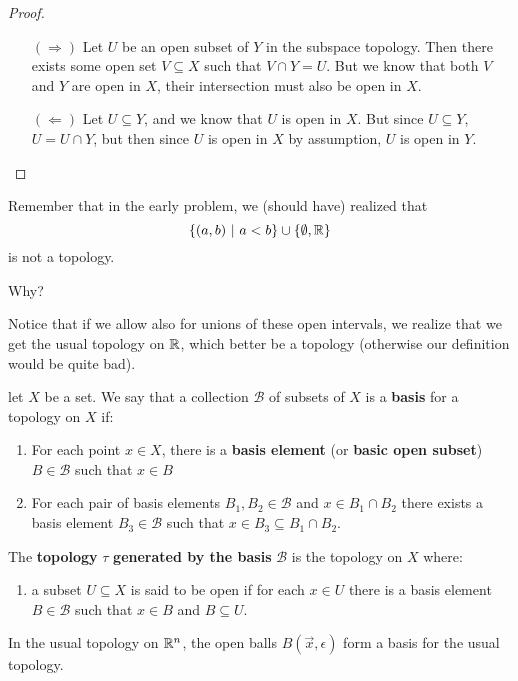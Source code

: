 \documentclass[12pt, twosided]{article}
\begin{document}
\begin{proof}
  \begin{enumerate}
  \item [\((\Rightarrow)\)] Let \(U\) be an open subset of \(Y\) in the subspace topology. Then there exists some open set \(V \subseteq X\) such that \(V \cap Y = U\). But we know that both \(V\) and \(Y\) are open in \(X\), their intersection must also be open in \(X\).
  \item [\((\Leftarrow)\)] Let \(U \subseteq Y\), and we know that \(U\) is open in \(X\). But since \(U \subseteq Y\), \(U = U \cap Y\), but then since \(U\) is open in \(X\) by assumption, \(U\) is open in \(Y\).
  \end{enumerate}
\end{proof}

Remember that in the early problem, we (should have) realized that \[\left\{ (a, b)\ \middle\vert\ a < b\right\} \cup \left\{ \emptyset, \mathbb{R} \right\}\] is not a topology.
\begin{exr}
  Why?
\end{exr}

Notice that if we allow also for unions of these open intervals, we realize that we get the usual topology on \(\mathbb{R}\), which better be a topology (otherwise our definition would be quite bad).

\begin{df}
  let \(X\) be a set. We say that a collection \(\mathcal{B}\) of subsets of \(X\) is a \textbf{basis} for a topology on \(X\) if:
  \begin{enumerate}
  \item For each point \(x\in X\), there is a \textbf{basis element} (or \textbf{basic open subset}) \(B \in \mathcal{B}\) such that \(x \in B\)
  \item For each pair of basis elements \(B_1, B_2 \in \mathcal{B}\) and \(x \in B_1 \cap B_2\) there exists a basis element \(B_3 \in \mathcal{B}\) such that \(x \in B_3 \subseteq B_1 \cap B_2\).
  \end{enumerate}

  The \textbf{topology} \(\tau\) \textbf{generated by the basis} \(\mathcal{B}\) is the topology on \(X\) where:
  \begin{enumerate}
  \item a subset \(U \subseteq X\) is said to be open if for each \(x \in U\) there is a basis element \(B \in \mathcal{B}\) such that \(x \in B\) and \(B \subseteq U\).
  \end{enumerate}
\end{df}

\begin{exa}
  In the usual topology on \(\mathbb{R}^n\), the open balls \(B(\vec{x}, \epsilon)\) form a basis for the usual topology.
\end{exa}
\end{document}
